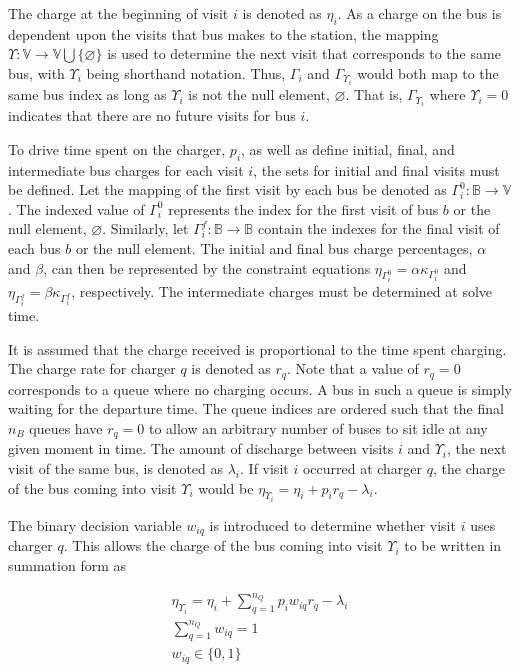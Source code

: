 The charge at the beginning of visit $i$ is denoted as $\eta_i$. As a charge on the bus is dependent upon the visits that
bus makes to the station, the mapping $\Upsilon: \mathbb{V} \rightarrow \mathbb{V} \bigcup \{\varnothing\}$ is used to determine the next visit
that corresponds to the same bus, with $\Upsilon_i$ being shorthand notation. Thus, $\Gamma_i$ and $\Gamma_{\Upsilon_i}$ would both map to the
same bus index as long as $\Upsilon_i$ is not the null element, $\varnothing$. That is, $\Gamma_{\Upsilon_i}$ where $\Upsilon_i = 0$ indicates
that there are no future visits for bus $i$.

To drive time spent on the charger, $p_i$, as well as define initial, final, and intermediate bus charges for each visit
$i$, the sets for initial and final visits must be defined. Let the mapping of the first visit by each bus be denoted as
$\Gamma^0_i : \mathbb{B} \rightarrow \mathbb{V}$. The indexed value of $\Gamma^0_i$ represents the index for the first visit of bus $b$ or
the null element, $\varnothing$. Similarly, let $\Gamma^f_i : \mathbb{B} \rightarrow \mathbb{B}$ contain the indexes for the final
visit of each bus $b$ or the null element. The initial and final bus charge percentages, $\alpha$ and $\beta$, can then be
represented by the constraint equations $\eta_{\Gamma^0_i} = \alpha \kappa_{\Gamma^0_i}$ and \(\eta_{\Gamma^f_i} = \beta \kappa_{\Gamma^f_i}\), respectively. The
intermediate charges must be determined at solve time.

It is assumed that the charge received is proportional to the time spent charging. The charge rate for charger $q$ is
denoted as $r_q$. Note that a value of $r_q = 0$ corresponds to a queue where no charging occurs. A bus in such a queue
is simply waiting for the departure time. The queue indices are ordered such that the final $n_B$ queues have $r_q = 0$
to allow an arbitrary number of buses to sit idle at any given moment in time. The amount of discharge between visits
$i$ and $\Upsilon_i$, the next visit of the same bus, is denoted as $\lambda_i$. If visit $i$ occurred at charger $q$, the charge of
the bus coming into visit $\Upsilon_i$ would be $\eta_{\Upsilon_i} = \eta_i + p_i r_q - \lambda_i$.

The binary decision variable $w_{iq}$ is introduced to determine whether visit $i$ uses charger $q$. This allows the
charge of the bus coming into visit $\Upsilon_i$ to be written in summation form as

\begin{subequations}
    \label{subeq:pre_next_charge}
\begin{align}
    \eta_{\Upsilon_i} = \eta_i + \sum_{q=1}^{n_Q} p_i w_{iq} r_q - \lambda_i  \\
    \sum_{q=1}^{n_Q} w_{iq} = 1 \\
    w_{iq} \in \{0,1\}
\end{align}
\end{subequations}

